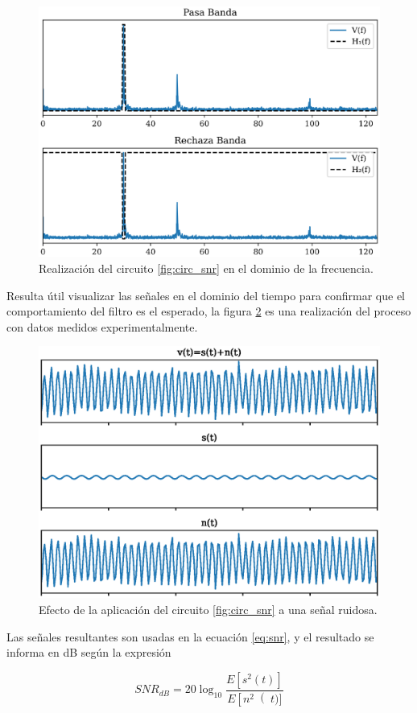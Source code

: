 \documentclass[11pt,a4paper]{extarticle}
\begin{document}
\begin{multicols}{2}
\begin{figure}[H]
	\centering
	\includegraphics[width=\linewidth]{Images/snr_filtros.eps}
	\caption{Realización del circuito \ref{fig:circ_snr} en el dominio de la frecuencia.}
	\label{fig:snr_filtros}
\end{figure}

Resulta útil visualizar las señales en el dominio del tiempo para confirmar que el comportamiento del filtro es el esperado, la figura \ref{fig:snr_tiempo} es una realización del proceso con datos medidos experimentalmente.

\begin{figure}[H]
	\centering
	\includegraphics[width=\linewidth]{Images/snr_tiempo.eps}
	\caption{Efecto de la aplicación del circuito \ref{fig:circ_snr} a una señal ruidosa.}
	\label{fig:snr_tiempo}
\end{figure}

Las señales resultantes son usadas en la ecuación \ref{eq:snr}, y el resultado se informa en dB según la expresión

\begin{equation}\label{eq:snr_db}
	SNR_{dB} = 20\log_{10}\frac{E\left[s^2(t)\right]}{E\left[n^2\right(t)]}
\end{equation}

\end{multicols}
\end{document}
